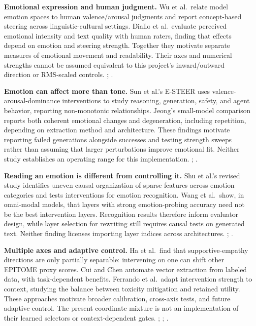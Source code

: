 \documentclass[manuscript,screen,nonacm]{acmart}
\begin{document}
\textbf{Emotional expression and human judgment.} Wu et al.~relate model
emotion spaces to human valence/arousal judgments and report
concept-based steering across linguistic-cultural settings. Diallo et
al.~evaluate perceived emotional intensity and text quality with human
raters, finding that effects depend on emotion and steering strength.
Together they motivate separate measures of emotional movement and
readability. Their axes and numerical strengths cannot be assumed
equivalent to this project's inward/outward direction or RMS-scaled
controls. \citep{wu2025emotion}; \citep{diallo2026style}.

\textbf{Emotion can affect more than tone.} Sun et al.'s E-STEER uses
valence-arousal-dominance interventions to study reasoning, generation,
safety, and agent behavior, reporting non-monotonic relationships.
Jeong's small-model comparison reports both coherent emotional changes
and degeneration, including repetition, depending on extraction method
and architecture. These findings motivate reporting failed generations
alongside successes and testing strength sweeps rather than assuming
that larger perturbations improve emotional fit. Neither study
establishes an operating range for this implementation.
\citep{sun2026emotion}; \citep{jeong2026emotion}.

\textbf{Reading an emotion is different from controlling it.} Shu et
al.'s revised study identifies uneven causal organization of sparse
features across emotion categories and tests interventions for emotion
recognition. Wang et al.~show, in omni-modal models, that layers with
strong emotion-probing accuracy need not be the best intervention
layers. Recognition results therefore inform evaluator design, while
layer selection for rewriting still requires causal tests on generated
text. Neither finding licenses importing layer indices across
architectures. \citep{shu2026emotion}; \citep{wang2026readbest}.

\textbf{Multiple axes and adaptive control.} Ha et al.~find that
supportive-empathy directions are only partially separable: intervening
on one can shift other EPITOME proxy scores. Cui and Chen automate
vector extraction from labeled data, with task-dependent benefits.
Ferrando et al.~adapt intervention strength to context, studying the
balance between toxicity mitigation and retained utility. These
approaches motivate broader calibration, cross-axis tests, and future
adaptive control. The present coordinate mixture is not an
implementation of their learned selectors or context-dependent gates.
\citep{ha2026empathy}; \citep{cui2025pas}; \citep{ferrando2025dsas}.
\end{document}
